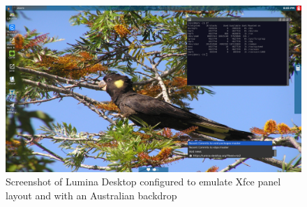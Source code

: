 %

\begin{figure}[!h]
  \centering
   \includegraphics[totalheight=3.2in,width=1.0\textwidth]{luminaoz.png}
  \caption{Screenshot of Lumina Desktop configured to emulate Xfce panel layout and with an Australian backdrop}
  \label{fig:oz}
\end{figure}

%

